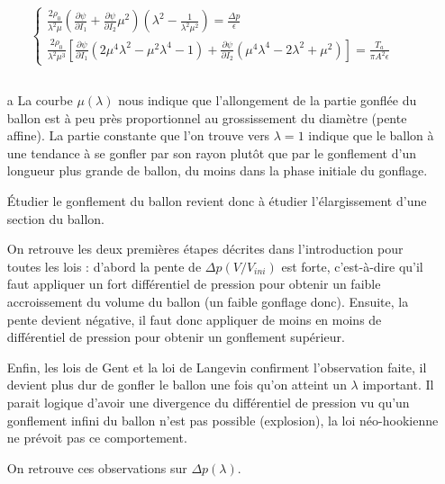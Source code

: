 \documentclass[a4paper,11pt]{article}
\begin{document}
$$
\begin{cases}
\frac{2\rho_0}{\lambda^2\mu} \left (\frac{\partial\psi}{\partial I_1} + \frac{\partial\psi}{\partial I_2} \mu^2 \right) \left ( \lambda^2 - \frac{1}{\lambda^2\mu^2} \right) = \frac{\Delta p}{\epsilon} \\
\frac{2\rho_0}{\lambda^2\mu^3} \left [\frac{\partial\psi}{\partial I_1} (2\mu^4\lambda^2-\mu^2\lambda^4-1) + \frac{\partial\psi}{\partial I_2} (\mu^4 \lambda^4 - 2\lambda^2 + \mu^2) \right] = \frac{T_a}{\pi A^2 \epsilon}
\end{cases}
$$

\subsection{}
\begin{enumerate}
\item[a]
La courbe $\mu(\lambda)$ nous indique que l'allongement de la partie gonflée du ballon est à peu près proportionnel au grossissement du diamètre (pente affine). La partie constante que l'on trouve vers $\lambda = 1$ indique que le ballon à une tendance à se gonfler par son rayon plutôt que par le gonflement d'un longueur plus grande de ballon, du moins dans la phase initiale du gonflage.

\hspace{0.8cm} Étudier le gonflement du ballon revient donc à étudier l'élargissement d'une section du ballon.

\hspace{0.8cm} On retrouve les deux premières étapes décrites dans l'introduction pour toutes les lois : d'abord la pente de $\Delta p (V/V_{ini})$ est forte, c'est-à-dire qu'il faut appliquer un fort différentiel de pression pour obtenir un faible accroissement du volume du ballon (un faible gonflage donc). Ensuite, la pente devient négative, il faut donc appliquer de moins en moins de différentiel de pression pour obtenir un gonflement supérieur.

\hspace{0.8cm}Enfin, les lois de Gent et la loi de Langevin confirment l'observation faite, il devient plus dur de gonfler le ballon une fois qu'on atteint un $\lambda$ important. Il parait logique d'avoir une divergence du différentiel de pression vu qu'un gonflement infini du ballon n'est pas possible (explosion), la loi néo-hookienne ne prévoit pas ce comportement.

On retrouve ces observations sur $\Delta p (\lambda)$.


\end{enumerate}
\end{document}
